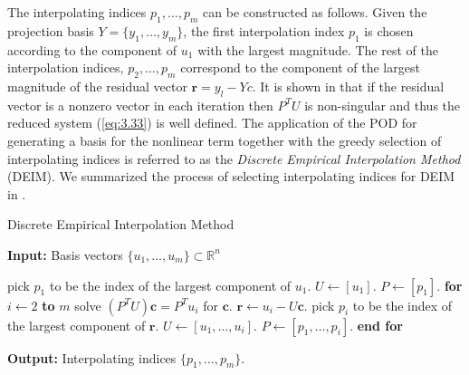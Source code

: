 The interpolating indices $p_1,\dots,p_m$ can be constructed as follows. Given the projection basis $Y = \{y_1,\dots,y_m\}$, the first interpolation index $p_1$ is chosen according to the component of $u_1$ with the largest magnitude. The rest of the interpolation indices, $p_2,\dots,p_m$ correspond to the component of the largest magnitude of the residual vector $\mathbf r = y_l - Y c$. It is shown in \cite{doi:10.1137/090766498} that if the residual vector is a nonzero vector in each iteration then $P^TU$ is non-singular and thus the reduced system (\ref{eq:3.33}) is well defined. The application of the POD for generating a basis for the nonlinear term together with the greedy selection of interpolating indices is referred to as the \emph{Discrete Empirical Interpolation Method} (DEIM). We summarized the process of selecting interpolating indices for DEIM in .

\begin{algorithm} 
\caption{Discrete Empirical Interpolation Method} \label{alg:3.4}
{\bf Input:}  Basis vectors $\{u_1,\dots , u_m\}\subset \mathbb R^n$
\begin{algorithmic} [1]
	\State pick $p_1$ to be the index of the largest component of $u_1$.
	\State $U \leftarrow [u_1]$.
	\State $P \leftarrow [p_1]$.
	\State \textbf{for} $i\leftarrow 2$ \textbf{to} $m$
		\State \hspace{0.5cm} solve $(P^TU)\mathbf c = P^T u_i$ for $\mathbf c$.
		\State \hspace{0.5cm} $\mathbf r \leftarrow u_i - U\mathbf c$.
		\State \hspace{0.5cm} pick $p_i$ to be the index of the largest component of $\mathbf r$.
		\State \hspace{0.5cm} $U \leftarrow [u_1,\dots,u_i]$.
		\State \hspace{0.5cm} $P \leftarrow [p_1,\dots,p_i]$.
	\State \textbf{end for}
\end{algorithmic}
\vspace{0.5cm}
{\bf Output:} Interpolating indices $\{p_1,\dots,p_m\}$.
\end{algorithm}


